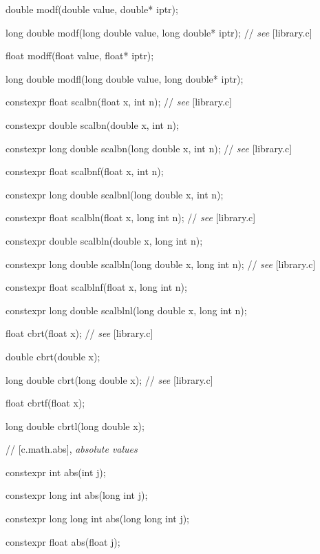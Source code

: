 \documentclass[prd,twocolumn,amsmath,amssymb,nofootinbib,eqsecnum]{revtex4-1}
\newcommand{\highlight}[1]{{\color{red} #1}}
\newcommand{\stdcomment}[1]{{// {\em see} [#1]}}
\begin{document}
{double modf(double value, double* iptr);

long double modf(long double value, long double* iptr); \stdcomment{library.c}

float modff(float value, float* iptr);

long double modfl(long double value, long double* iptr);

\vspace{2ex}

\highlight{constexpr} float scalbn(float x, int n); \stdcomment{library.c}

\highlight{constexpr} double scalbn(double x, int n);

\highlight{constexpr} long double scalbn(long double x, int n); \stdcomment{library.c}

\highlight{constexpr} float scalbnf(float x, int n);

\highlight{constexpr} long double scalbnl(long double x, int n);

\vspace{2ex}

\highlight{constexpr} float scalbln(float x, long int n); \stdcomment{library.c}

\highlight{constexpr} double scalbln(double x, long int n);

\highlight{constexpr} long double scalbln(long double x, long int n); \stdcomment{library.c}

\highlight{constexpr} float scalblnf(float x, long int n);

\highlight{constexpr} long double scalblnl(long double x, long int n);

\vspace{2ex}

float cbrt(float x); \stdcomment{library.c}

double cbrt(double x);

long double cbrt(long double x); \stdcomment{library.c}

float cbrtf(float x);

long double cbrtl(long double x);

\vspace{2ex}

//  [c.math.abs], {\em absolute values}

\highlight{constexpr} int abs(int j);

\highlight{constexpr} long int abs(long int j);

\highlight{constexpr} long long int abs(long long int j);

\highlight{constexpr} float abs(float j);

}
\end{document}
